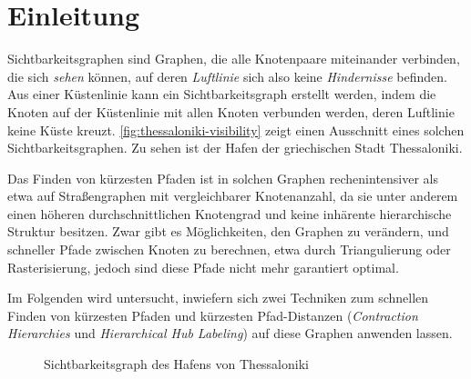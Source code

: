 \chapter{Einleitung}

Sichtbarkeitsgraphen sind Graphen, die alle Knotenpaare miteinander verbinden, die sich \emph{sehen} können, auf deren \emph{Luftlinie} sich also keine \emph{Hindernisse} befinden.
Aus einer Küstenlinie kann ein Sichtbarkeitsgraph erstellt werden, indem die Knoten auf der Küstenlinie mit allen Knoten verbunden werden, deren Luftlinie keine Küste kreuzt.
\autoref{fig:thessaloniki-visibility} zeigt einen Ausschnitt eines solchen Sichtbarkeitsgraphen.
Zu sehen ist der Hafen der griechischen Stadt Thessaloniki.

Das Finden von kürzesten Pfaden ist in solchen Graphen rechenintensiver als etwa auf Straßengraphen mit vergleichbarer Knotenanzahl, da sie unter anderem einen höheren durchschnittlichen Knotengrad und keine inhärente hierarchische Struktur besitzen.
Zwar gibt es Möglichkeiten, den Graphen zu verändern, und schneller Pfade zwischen Knoten zu berechnen, etwa durch Triangulierung oder Rasterisierung, jedoch sind diese Pfade nicht mehr garantiert optimal.

Im Folgenden wird untersucht, inwiefern sich zwei Techniken zum schnellen Finden von kürzesten Pfaden und kürzesten Pfad-Distanzen (\emph{Contraction Hierarchies} und \emph{Hierarchical Hub Labeling}) auf diese Graphen anwenden lassen.

\begin{figure}[ht]%
  \centering
  \caption{Sichtbarkeitsgraph des Hafens von Thessaloniki}%
  \label{fig:thessaloniki-visibility}%
\end{figure}
% 
% 
% 
% 
% 
% 
% 
